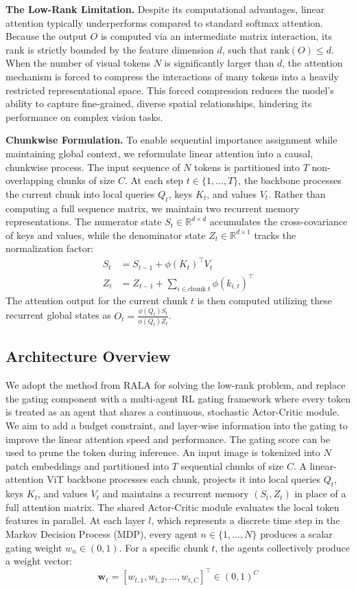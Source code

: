 \textbf{The Low-Rank Limitation.} Despite its computational advantages, linear attention typically underperforms compared to standard softmax attention. Because the output $O$ is computed via an intermediate matrix interaction, its rank is strictly bounded by the feature dimension $d$, such that $\text{rank}(O) \le d$. When the number of visual tokens $N$ is significantly larger than $d$, the attention mechanism is forced to compress the interactions of many tokens into a heavily restricted representational space. This forced compression reduces the model's ability to capture fine-grained, diverse spatial relationships, hindering its performance on complex vision tasks.

\textbf{Chunkwise Formulation.} To enable sequential importance assignment while maintaining global context, we reformulate linear attention into a causal, chunkwise process. The input sequence of $N$ tokens is partitioned into $T$ non-overlapping chunks of size $C$. At each step $t \in \{1, \dots, T\}$, the backbone processes the current chunk into local queries $Q_t$, keys $K_t$, and values $V_t$. Rather than computing a full sequence matrix, we maintain two recurrent memory representations. The numerator state $S_t \in \mathbb{R}^{d \times d}$ accumulates the cross-covariance of keys and values, while the denominator state $Z_t \in \mathbb{R}^{d \times 1}$ tracks the normalization factor:
\begin{align}
	S_t & = S_{t-1} + \phi(K_t)^\top V_t                               \\
	Z_t & = Z_{t-1} + \sum_{i \in \text{chunk } t} \phi(k_{i, t})^\top
\end{align}
The attention output for the current chunk $t$ is then computed utilizing these recurrent global states as $O_t = \frac{\phi(Q_t) S_t}{\phi(Q_t) Z_t}$.
\subsection{Architecture Overview}
We adopt the method from RALA \cite{fan2025breaking} for solving the low-rank problem, and replace the gating component with a multi-agent RL gating framework where every token is treated as an agent that shares a continuous, stochastic Actor-Critic module. We aim to add a budget constraint, and layer-wise information into the gating to improve the linear attention speed and performance. The gating score can be used to prune the token during inference.
An input image is tokenized into $N$ patch embeddings and partitioned into $T$ sequential chunks of size $C$. A linear-attention ViT backbone processes each chunk, projects it into local queries $Q_t$, keys $K_t$, and values $V_t$ and maintains a recurrent memory $(S_t, Z_t)$ in place of a full attention matrix.
The shared Actor-Critic module evaluates the local token features in parallel. At each layer $l$, which represents a discrete time step in the Markov Decision Process (MDP), every agent $n \in \{1,\dots,N\}$ produces a scalar gating weight $w_n \in (0,1)$. For a specific chunk $t$, the agents collectively produce a weight vector:
\begin{equation}
	\mathbf{w}_t = [w_{t,1}, w_{t,2}, \dots, w_{t,C}]^\top \in (0,1)^C
\end{equation}

